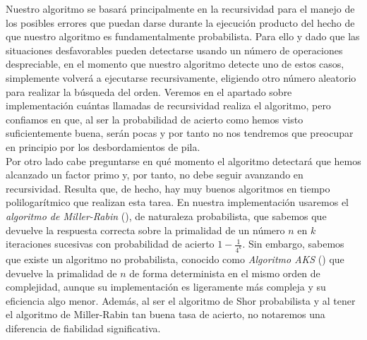 \documentclass[11pt, spanish]{report}
\numberwithin{equation}{section}
\numberwithin{defin}{section}
\begin{document}
Nuestro algoritmo se basará principalmente en la recursividad para el manejo de los posibles errores que puedan darse durante la ejecución producto del hecho de que nuestro algoritmo es fundamentalmente probabilista. Para ello y dado que las situaciones desfavorables pueden detectarse usando un número de operaciones despreciable, en el momento que nuestro algoritmo detecte uno de estos casos, simplemente volverá a ejecutarse recursivamente, eligiendo otro número aleatorio para realizar la búsqueda del orden. Veremos en el apartado sobre implementación cuántas llamadas de recursividad realiza el algoritmo, pero confiamos en que, al ser la probabilidad de acierto como hemos visto suficientemente buena, serán pocas y por tanto no nos tendremos que preocupar en principio por los desbordamientos de pila. \\

Por otro lado cabe preguntarse en qué momento el algoritmo detectará que hemos alcanzado un factor primo y, por tanto, no debe seguir avanzando en recursividad. Resulta que, de hecho, hay muy buenos algoritmos en tiempo polilogarítmico que realizan esta tarea. En nuestra implementación usaremos el \emph{algoritmo de Miller-Rabin}\footnotemark{} (\cite{MILLER1976300}), de naturaleza probabilista, que sabemos que devuelve la respuesta correcta sobre la primalidad de un número $n$ en $k$ iteraciones sucesivas con probabilidad de acierto $1-\frac{1}{4^k}$. Sin embargo, sabemos que existe un algoritmo no probabilista, conocido como \emph{Algoritmo AKS} (\cite{zbMATH02157791}) que devuelve la primalidad de $n$ de forma determinista en el mismo orden de complejidad, aunque su implementación es ligeramente más compleja y su eficiencia algo menor. Además, al ser el algoritmo de Shor probabilista y al tener el algoritmo de Miller-Rabin tan buena tasa de acierto, no notaremos una diferencia de fiabilidad significativa.\\

\end{document}
